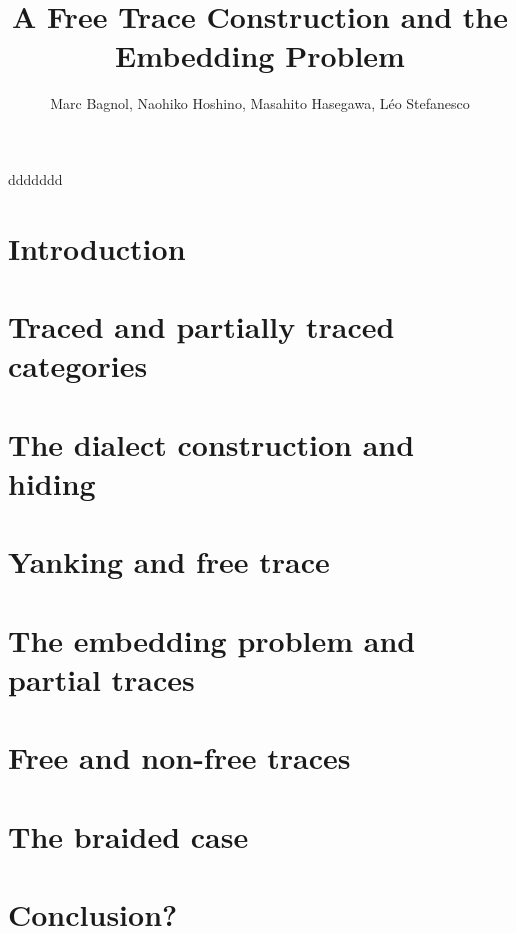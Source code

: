 \documentclass{article}
\begin{document}


\title{A Free Trace Construction and the Embedding Problem}

\author{Marc Bagnol, Naohiko Hoshino, Masahito Hasegawa, Léo Stefanesco}

\maketitle

\begin{abstract}
	
\end{abstract}
ddddddd
\section*{Introduction}


\section{Traced and partially traced categories}


\section{The dialect construction and hiding}


\section{Yanking and free trace}


\section{The embedding problem and partial traces}


\section{Free and non-free traces}


\section{The braided case}


\section*{Conclusion?}
%




\end{document}
